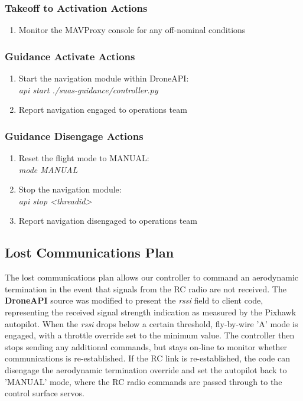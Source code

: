 \documentclass{aiaa}
\begin{document}
\subsubsection{Takeoff to Activation Actions}
\begin{enumerate}
	\item Monitor the MAVProxy console for any off-nominal conditions
\end{enumerate}
\subsubsection{Guidance Activate Actions}
\begin{enumerate}
	\item Start the navigation module within DroneAPI: \\
	\textit{api start ./suas-guidance/controller.py}
	\item Report navigation engaged to operations team
\end{enumerate}
\subsubsection{Guidance Disengage Actions}
\begin{enumerate}
	\item Reset the flight mode to MANUAL: \\
	\textit{mode MANUAL}
	\item Stop the navigation module: \\
	\textit{api stop \textless threadid\textgreater}
	\item Report navigation disengaged to operations team
\end{enumerate}

\subsection{Lost Communications Plan}
The lost communications plan allows our controller to command an aerodynamic termination in the event that signals from the RC radio are not received. The \textbf{DroneAPI} source was modified to present the \textit{rssi} field to client code, representing the received signal strength indication as measured by the Pixhawk autopilot. When the \textit{rssi} drops below a certain threshold, fly-by-wire 'A' mode is engaged, with a throttle override set to the minimum value. The controller then stops sending any additional commands, but stays on-line to monitor whether communications is re-established. If the RC link is re-established, the code can disengage the aerodynamic termination override and set the autopilot back to 'MANUAL' mode, where the RC radio commands are passed through to the control surface servos.
\end{document}
